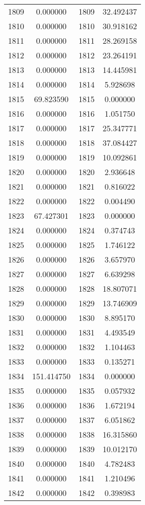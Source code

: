 \documentclass[12pt]{article}
\begin{document}
\begin{longtable}{@{}cccc@{}}
1809 & 0.000000 & 1809 & 32.492437 \\
1810 & 0.000000 & 1810 & 30.918162 \\
1811 & 0.000000 & 1811 & 28.269158 \\
1812 & 0.000000 & 1812 & 23.264191 \\
1813 & 0.000000 & 1813 & 14.445981 \\
1814 & 0.000000 & 1814 & 5.928698 \\
1815 & 69.823590 & 1815 & 0.000000 \\
1816 & 0.000000 & 1816 & 1.051750 \\
1817 & 0.000000 & 1817 & 25.347771 \\
1818 & 0.000000 & 1818 & 37.084427 \\
1819 & 0.000000 & 1819 & 10.092861 \\
1820 & 0.000000 & 1820 & 2.936648 \\
1821 & 0.000000 & 1821 & 0.816022 \\
1822 & 0.000000 & 1822 & 0.004490 \\
1823 & 67.427301 & 1823 & 0.000000 \\
1824 & 0.000000 & 1824 & 0.374743 \\
1825 & 0.000000 & 1825 & 1.746122 \\
1826 & 0.000000 & 1826 & 3.657970 \\
1827 & 0.000000 & 1827 & 6.639298 \\
1828 & 0.000000 & 1828 & 18.807071 \\
1829 & 0.000000 & 1829 & 13.746909 \\
1830 & 0.000000 & 1830 & 8.895170 \\
1831 & 0.000000 & 1831 & 4.493549 \\
1832 & 0.000000 & 1832 & 1.104463 \\
1833 & 0.000000 & 1833 & 0.135271 \\
1834 & 151.414750 & 1834 & 0.000000 \\
1835 & 0.000000 & 1835 & 0.057932 \\
1836 & 0.000000 & 1836 & 1.672194 \\
1837 & 0.000000 & 1837 & 6.051862 \\
1838 & 0.000000 & 1838 & 16.315860 \\
1839 & 0.000000 & 1839 & 10.012170 \\
1840 & 0.000000 & 1840 & 4.782483 \\
1841 & 0.000000 & 1841 & 1.210496 \\
1842 & 0.000000 & 1842 & 0.398983 \\

\end{longtable}
\end{document}
